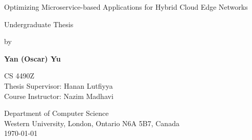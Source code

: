 \begin{titlepage}
    \begin{center}
        \vspace*{1cm}

        \Huge{Optimizing Microservice-based Applications for Hybrid Cloud Edge Networks}
        \vspace{0.5cm}

        \Large
        Undergraduate Thesis
        \vspace{0.5cm}

        by
        \vspace{0.5cm}

        \textbf{Yan (Oscar) Yu}

        \vfill

        \large
        CS 4490Z\\
        Thesis Supervisor: Hanan Lutfiyya\\
        Course Instructor: Nazim Madhavi

        \vspace{0.5cm}
        Department of Computer Science\\
        Western University, London, Ontario N6A 5B7, Canada\\
        \today

    \end{center}
\end{titlepage}